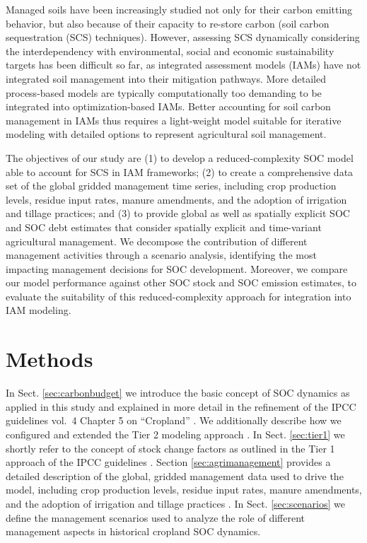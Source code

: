 \documentclass[gc, manuscript]{copernicus}
\begin{document}
Managed soils have been increasingly studied not only for their carbon emitting behavior, but also because of their capacity to re-store carbon (soil carbon sequestration (SCS) techniques). However, assessing SCS dynamically considering the interdependency with environmental, social and economic sustainability targets has been difficult so far, as integrated assessment models (IAMs) \citep{popp_land-use_2016, rogelj_scenarios_2018, forster_sr1p5_2018} have not integrated soil management into their mitigation pathways. More detailed process-based models are typically computationally too demanding to be integrated into optimization-based IAMs. Better accounting for soil carbon management in IAMs thus requires a light-weight model suitable for iterative modeling with detailed options to represent agricultural soil management.

The objectives of our study are (1) to develop a reduced-complexity SOC model able to account for SCS in IAM frameworks; (2) to create a comprehensive data set of the global gridded management time series, including crop production levels, residue input rates, manure amendments, and the adoption of irrigation and tillage practices; and (3) to provide global as well as spatially explicit SOC and SOC debt estimates that consider spatially explicit and time-variant agricultural management.
We decompose the contribution of different management activities through a scenario analysis, identifying the most impacting management decisions for SOC development. Moreover, we compare our model performance against other SOC stock and SOC emission estimates, to evaluate the suitability of this reduced-complexity approach for integration into IAM modeling.
\newpage

\hypertarget{methods}{%
\section{Methods}\label{methods}}

In Sect. \ref{sec:carbonbudget} we introduce the basic concept of SOC dynamics as applied in this study and explained in more detail in the refinement of the IPCC guidelines vol.~4 Chapter 5 on ``Cropland'' \citep{ogle_cropland_in_ipcc_2019}. We additionally describe how we configured and extended the Tier 2 modeling approach \citep[for model code see][]{karstens_mrsoil_2020}. In Sect. \ref{sec:tier1} we shortly refer to the concept of stock change factors as outlined in the Tier 1 approach of the IPCC guidelines \citep{eggleston_ipcc_2006, calvo_buendia_ipcc_2019}.
Section \ref{sec:agrimanagement} provides a detailed description of the global, gridded management data used to drive the model, including crop production levels, residue input rates, manure amendments, and the adoption of irrigation and tillage practices \citep[for model code see][]{bodirsky_mrcommons_2020}. In Sect. \ref{sec:scenarios} we define the management scenarios used to analyze the role of different management aspects in historical cropland SOC dynamics.
\end{document}
